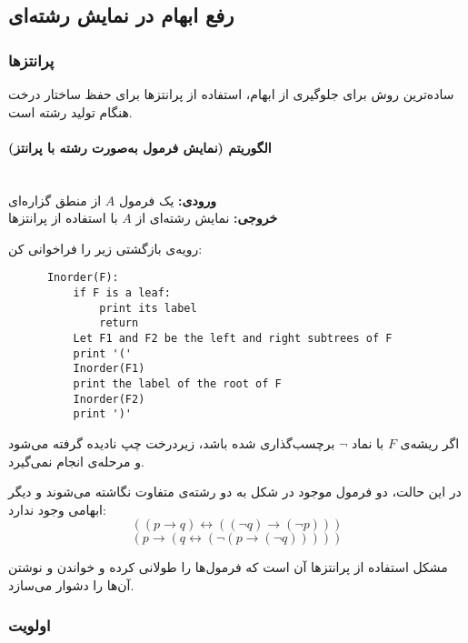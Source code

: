 \subsection*{ رفع ابهام در نمایش رشته‌ای}
   \subsubsection*{پرانتزها}
      
     ساده‌ترین روش برای جلوگیری از ابهام، استفاده از پرانتزها برای حفظ ساختار درخت هنگام تولید رشته است.
      
     \paragraph{الگوریتم  (نمایش فرمول به‌صورت رشته با پرانتز)} \hfill \\
     \textbf{ورودی:} یک فرمول $A$ از منطق گزاره‌ای \\
     \textbf{خروجی:} نمایش رشته‌ای از $A$ با استفاده از پرانتزها
      
     رویه‌ی بازگشتی زیر را فراخوانی کن: 
      
     \begin{latin}
      \begin{verbatim}
      Inorder(F):
          if F is a leaf:
              print its label
              return
          Let F1 and F2 be the left and right subtrees of F
          print '('
          Inorder(F1)
          print the label of the root of F
          Inorder(F2)
          print ')'
      \end{verbatim}
     \end{latin}
   
     اگر ریشه‌ی $F$ با نماد $\neg$ برچسب‌گذاری شده باشد، زیر‌درخت چپ نادیده گرفته می‌شود و مرحله‌ی  انجام نمی‌گیرد.
   
     در این حالت، دو فرمول موجود در شکل  به دو رشته‌ی متفاوت نگاشته می‌شوند و دیگر ابهامی وجود ندارد:
     \[
     ((p \rightarrow q) \leftrightarrow ((\neg q) \rightarrow (\neg p)))
     \]
     \[
     (p \rightarrow (q \leftrightarrow (\neg (p \rightarrow (\neg q)))))
     \]
   
     مشکل استفاده از پرانتزها آن است که فرمول‌ها را طولانی کرده و خواندن و نوشتن آن‌ها را دشوار می‌سازد.
   
   \subsubsection*{اولویت}
     
